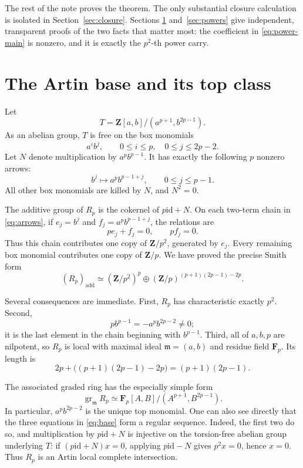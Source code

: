 \documentclass[11pt]{amsart}
\theoremstyle{definition}
\theoremstyle{remark}
\newcommand{\Z}{\mathbf Z}
\newcommand{\F}{\mathbf F}
\newcommand{\gr}{\operatorname{gr}}
\newcommand{\m}{\mathfrak m}
\newcommand{\id}{\mathrm{id}}
\begin{document}
The rest of the note proves the theorem.  The only substantial closure
calculation is isolated in Section~\ref{sec:closure}.  Sections
\ref{sec:base} and~\ref{sec:powers} give independent, transparent
proofs of the two facts that matter most: the coefficient in
\eqref{eq:power-main} is nonzero, and it is exactly the \(p^2\)-th power
carry.

\section{The Artin base and its top class}\label{sec:base}

Let
\[
 T=\Z[a,b]/(a^{p+1},b^{2p-1}).
\]
As an abelian group, \(T\) is free on the box monomials
\begin{equation}\label{eq:box}
 a^ib^j,\qquad 0\leq i\leq p,\quad 0\leq j\leq2p-2.
\end{equation}
Let \(N\) denote multiplication by \(a^pb^{p-1}\).  It has exactly the
following \(p\) nonzero arrows:
\begin{equation}\label{eq:arrows}
 b^j\longmapsto a^pb^{p-1+j},
 \qquad 0\leq j\leq p-1.
\end{equation}
All other box monomials are killed by \(N\), and \(N^2=0\).

The additive group of \(R_p\) is the cokernel of \(p\id+N\).  On each
two-term chain in \eqref{eq:arrows}, if \(e_j=b^j\) and
\(f_j=a^pb^{p-1+j}\), the relations are
\[
 pe_j+f_j=0,\qquad pf_j=0.
\]
Thus this chain contributes one copy of \(\Z/p^2\), generated by
\(e_j\).  Every remaining box monomial contributes one copy of
\(\Z/p\).  We have proved the precise Smith form
\begin{equation}\label{eq:additive}
 (R_p)_{\mathrm{add}}\simeq
 (\Z/p^2)^p\oplus
 (\Z/p)^{(p+1)(2p-1)-2p}.
\end{equation}

Several consequences are immediate.  First, \(R_p\) has characteristic
exactly \(p^2\).  Second,
\begin{equation}\label{eq:top-nonzero}
 p b^{p-1}=-a^pb^{2p-2}\ne0;
\end{equation}
it is the last element in the chain beginning with \(b^{p-1}\).  Third,
all of \(a,b,p\) are nilpotent, so \(R_p\) is local with maximal ideal
\(\m=(a,b)\) and residue field \(\F_p\).  Its length is
\[
 2p+\bigl((p+1)(2p-1)-2p\bigr)=(p+1)(2p-1).
\]

The associated graded ring has the especially simple form
\begin{equation}\label{eq:gr-base}
 \gr_{\m}R_p\simeq
 \F_p[A,B]/(A^{p+1},B^{2p-1}).
\end{equation}
In particular, \(a^pb^{2p-2}\) is the unique top monomial.  One can also
see directly that the three equations in \eqref{eq:base} form a regular
sequence.  Indeed, the first two do so, and multiplication by
\(p\id+N\) is injective on the torsion-free abelian group underlying
\(T\): if \((p\id+N)x=0\), applying \(p\id-N\) gives \(p^2x=0\), hence
\(x=0\).  Thus \(R_p\) is an Artin local complete intersection.
\end{document}
